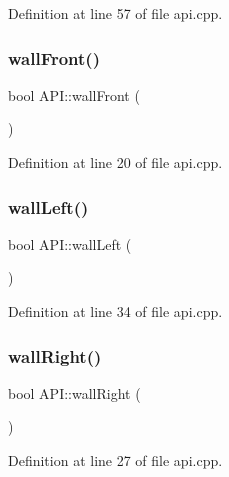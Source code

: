 Definition at line 57 of file api.\+cpp.

\mbox{\label{class_a_p_i_a3452beb4232e7960ffdb8c0d4a1f0d30}} 
\subsubsection{\texorpdfstring{wall\+Front()}{wallFront()}}
{\footnotesize\ttfamily bool A\+P\+I\+::wall\+Front (\begin{DoxyParamCaption}{ }\end{DoxyParamCaption})\hspace{0.3cm}{\ttfamily [static]}}



Definition at line 20 of file api.\+cpp.

\mbox{\label{class_a_p_i_a43b1e7f9b91aba577078af681c7807b3}} 
\subsubsection{\texorpdfstring{wall\+Left()}{wallLeft()}}
{\footnotesize\ttfamily bool A\+P\+I\+::wall\+Left (\begin{DoxyParamCaption}{ }\end{DoxyParamCaption})\hspace{0.3cm}{\ttfamily [static]}}



Definition at line 34 of file api.\+cpp.

\mbox{\label{class_a_p_i_acdc812c3acadeb2890691e6c95a89816}} 
\subsubsection{\texorpdfstring{wall\+Right()}{wallRight()}}
{\footnotesize\ttfamily bool A\+P\+I\+::wall\+Right (\begin{DoxyParamCaption}{ }\end{DoxyParamCaption})\hspace{0.3cm}{\ttfamily [static]}}



Definition at line 27 of file api.\+cpp.

